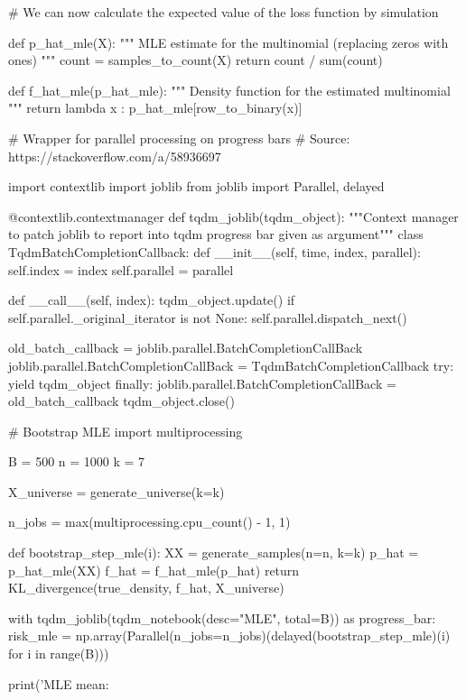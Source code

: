 \begin{python}
# We can now calculate the expected value of the loss function by simulation

def p_hat_mle(X):
    """ MLE estimate for the multinomial (replacing zeros with ones) """
    count = samples_to_count(X)
    return count / sum(count)


def f_hat_mle(p_hat_mle):
    """ Density function for the estimated multinomial """
    return lambda x : p_hat_mle[row_to_binary(x)]
\end{python}

\begin{python}
# Wrapper for parallel processing on progress bars
# Source: https://stackoverflow.com/a/58936697

import contextlib
import joblib
from joblib import Parallel, delayed

@contextlib.contextmanager
def tqdm_joblib(tqdm_object):
    """Context manager to patch joblib to report into tqdm progress bar given as argument"""
    class TqdmBatchCompletionCallback:
        def __init__(self, time, index, parallel):
            self.index = index
            self.parallel = parallel

        def __call__(self, index):
            tqdm_object.update()
            if self.parallel._original_iterator is not None:
                self.parallel.dispatch_next()

    old_batch_callback = joblib.parallel.BatchCompletionCallBack
    joblib.parallel.BatchCompletionCallBack = TqdmBatchCompletionCallback
    try:
        yield tqdm_object
    finally:
        joblib.parallel.BatchCompletionCallBack = old_batch_callback
        tqdm_object.close()  
\end{python}

\begin{python}
# Bootstrap MLE
import multiprocessing

B = 500
n = 1000
k = 7

X_universe = generate_universe(k=k)

n_jobs = max(multiprocessing.cpu_count() - 1, 1)

def bootstrap_step_mle(i):
    XX = generate_samples(n=n, k=k)
    p_hat = p_hat_mle(XX)
    f_hat = f_hat_mle(p_hat)
    return KL_divergence(true_density, f_hat, X_universe)

with tqdm_joblib(tqdm_notebook(desc="MLE", total=B)) as progress_bar:
    risk_mle = np.array(Parallel(n_jobs=n_jobs)(delayed(bootstrap_step_mle)(i) for i in range(B)))

print('MLE mean: %
\end{python}


